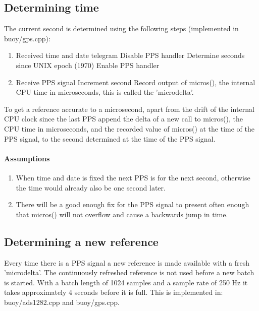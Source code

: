 \documentclass[a4paper]{article}
\begin{document}
\begin{multicols}{2}
  \subsection{Determining time}
  The current second is determined using the following steps
  (implemented in buoy/gps.cpp):

  \begin{enumerate}
    \item Received time and date telegram
      \subitem Disable PPS handler
      \subitem Determine seconds since UNIX epoch (1970)
      \subitem Enable PPS handler
    \item Receive PPS signal
      \subitem Increment second
      \subitem Record output of micros(), the internal CPU time in
      microseconds, this is called the 'microdelta'.
  \end{enumerate}

  To get a reference accurate to a microsecond, apart from the drift
  of the internal CPU clock since the last PPS append the delta of a new
  call to micros(), the CPU time in microseconds, and the recorded value
  of micros() at the time of the PPS signal, to the second determined at
  the time of the PPS signal.

  \paragraph{Assumptions}
  \begin{enumerate}
    \item When time and date is fixed the next PPS is for the next
      second, otherwise the time would already also be one second
      later.
    \item There will be a good enough fix for the PPS signal to present
      often enough that micros() will not overflow and cause a backwards
      jump in time.
  \end{enumerate}

  \subsection{Determining a new reference}
  Every time there is a PPS signal a
  new reference is made available with a fresh 'microdelta'. The
  continuously refreshed reference is not used before a new batch is
  started. With a batch length of 1024 samples and a sample rate of 250
  Hz it takes approximately 4 seconds before it is full. This is
  implemented in: buoy/ads1282.cpp and buoy/gps.cpp.


\end{multicols}
\end{document}
